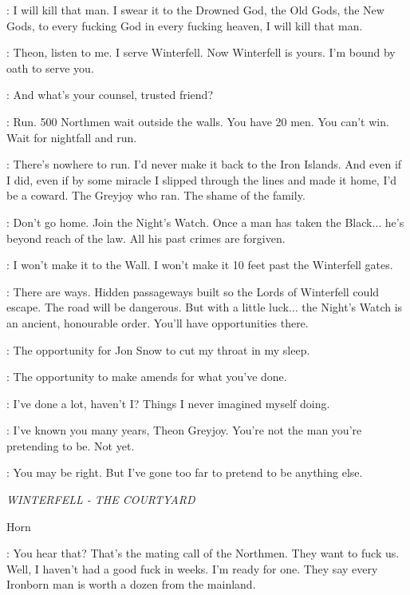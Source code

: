 
\THEON: I will kill that man. I swear it to the Drowned God, the Old Gods, the New Gods, to every fucking God in every fucking heaven, I will kill that man. 

\LUWIN: Theon, listen to me. I serve Winterfell. Now Winterfell is yours. I'm bound by oath to serve you. 

\THEON: And what's your counsel, trusted friend? 

\LUWIN: Run. 500 Northmen wait outside the walls. You have 20 men. You can't win. Wait for nightfall and run. 

\THEON: There's nowhere to run. I'd never make it back to the Iron Islands. And even if I did, even if by some miracle I slipped through the lines and made it home, I'd be a coward. The Greyjoy who ran. The shame of the family. 

\LUWIN: Don't go home. Join the Night's Watch. Once a man has taken the Black$\ldots$ he's beyond reach of the law. All his past crimes are forgiven. 

\THEON: I won't make it to the Wall. I won't make it 10 feet past the Winterfell gates. 

\LUWIN: There are ways. Hidden passageways built so the Lords of Winterfell could escape. The road will be dangerous. But with a little luck$\ldots$ the Night's Watch is an ancient, honourable order. You'll have opportunities there. 

\THEON: The opportunity for Jon Snow to cut my throat in my sleep. 

\LUWIN: The opportunity to make amends for what you've done. 

\THEON: I've done a lot, haven't I? Things I never imagined myself doing. 

\LUWIN:  I've known you many years, Theon Greyjoy. You're not the man you're pretending to be. Not yet. 

\THEON: You may be right. But I've gone too far to pretend to be anything else. 


\scene

\textit{WINTERFELL - THE COURTYARD} 

\sfx Horn


\THEON: You hear that? That's the mating call of the Northmen. They want to fuck us. Well, I haven't had a good fuck in weeks. I'm ready for one.  They say every Ironborn man is worth a dozen from the mainland. 

